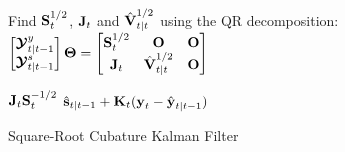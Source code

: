 \begin{algorithm}
{\begin{minipage}{\linewidth}
					Find \( \boldsymbol{\mathrm{S}}_t^{1/2} \), \( \boldsymbol{\mathrm{J}}_t \) and \( \hat{\boldsymbol{\mathrm{V}}}_{t \vert t}^{1/2} \) using the QR decomposition: \\
					\null\hspace{1cm} \(
						\begin{bmatrix}
							\boldsymbol{\mathrm{\mathcal{Y}}}_{t \vert t - 1}^y \\
							\boldsymbol{\mathrm{\mathcal{Y}}}_{t \vert t - 1}^s
						\end{bmatrix}
						\boldsymbol{\mathrm{\Theta}}
						=
						\begin{bmatrix}
							\boldsymbol{\mathrm{S}}_t^{1/2} & \boldsymbol{\mathrm{O}} & \boldsymbol{\mathrm{O}} \\
							\boldsymbol{\mathrm{J}}_t       & \hat{\boldsymbol{\mathrm{V}}}_{t \vert t}^{1/2} & \boldsymbol{\mathrm{O}}
						\end{bmatrix}
					\)
				\end{minipage} \; \vspace{-0.5cm}
				 \( \boldsymbol{\mathrm{J}}_t \boldsymbol{\mathrm{S}}_t^{-1/2} \) \;
				 \( \hat{\boldsymbol{\mathrm{s}}}_{t \vert t - 1} + \boldsymbol{\mathrm{K}}_t (\boldsymbol{\mathrm{y}}_t - \hat{\boldsymbol{\mathrm{y}}}_{t \vert t - 1}) \) \;
			}
			\caption{Square-Root Cubature Kalman Filter}
			\label{alg:sqrtCubatureKalmanFilter}
		\end{algorithm}

